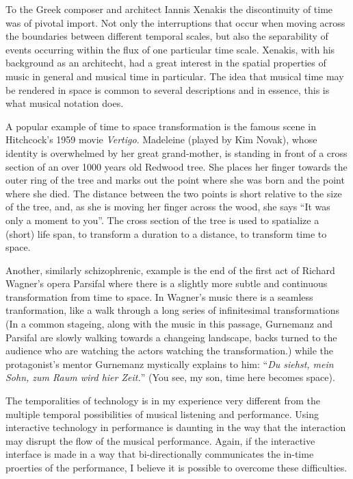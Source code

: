 \documentclass{article}
\begin{document}
To the Greek composer and architect Iannis Xenakis the discontinuity of time was of pivotal import. Not only the interruptions that occur when moving across the boundaries between different temporal scales, but also the separability of events occurring within the flux of one particular time scale. Xenakis, with his background as an architecht, had a great interest in the spatial properties of music in general and musical time in particular. The idea that musical time may be rendered in space is common to several descriptions and in essence, this is what  musical notation does.

A popular example of time to space transformation is the famous scene in Hitchcock's 1959 movie \emph{Vertigo}. Madeleine (played by Kim Novak), whose identity is overwhelmed by her great grand-mother, is standing in front of a cross section of an over 1000 years old Redwood tree. She places her finger towards the outer ring of the tree and marks out the point where she was born and the point where she died. The distance between the two points is short relative to the size of the tree, and, as she is moving her finger across the wood, she says ``It was only a moment to you''. \cite{hitchcock59} The cross section of the tree is used to spatialize a (short) life span, to transform a duration to a distance, to transform time to space. 

Another, similarly schizophrenic, example is the end of the first act of Richard Wagner's opera Parsifal where there is a slightly more subtle and continuous transformation from time to space. In Wagner's music there is a seamless tranformation, like a walk through a long series of infinitesimal transformations (In a common stageing, along with the music in this passage, Gurnemanz and Parsifal are slowly walking towards a changeing landscape, backs turned to the audience who are watching the actors watching the transformation.) while the protagonist's mentor Gurnemanz mystically explains to him: ``\emph{Du siehst, mein Sohn, zum Raum wird hier Zeit.}'' (You see, my son, time here becomes space). 

The temporalities of technology is in my experience very different from the multiple temporal possibilities of musical listening and performance. Using interactive technology in performance is daunting in the way that the interaction may disrupt the flow of the musical performance. Again, if the interactive interface is made in a way that bi-directionally communicates the in-time proerties of the performance, I believe it is possible to overcome these difficulties.
\end{document}
